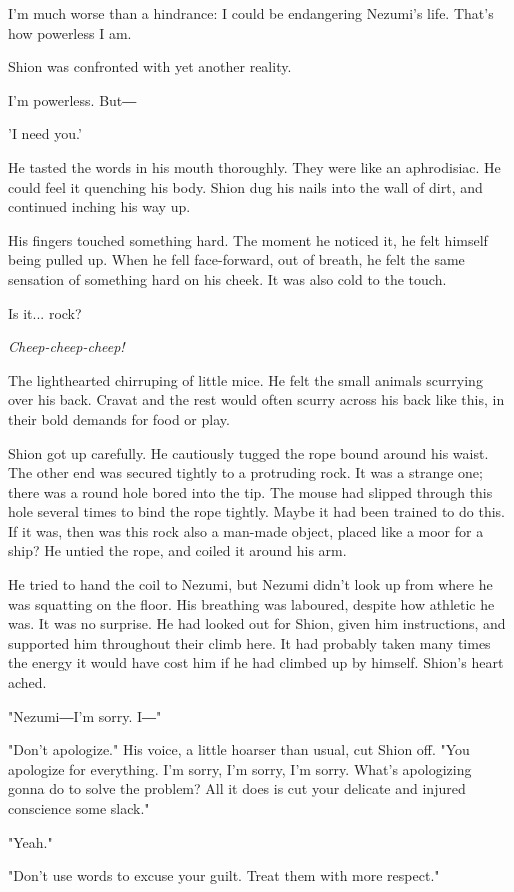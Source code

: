 I'm much worse than a hindrance: I could be endangering Nezumi's life.
That's how powerless I am.

Shion was confronted with yet another reality.

I'm powerless. But―

'I need you.'

He tasted the words in his mouth thoroughly. They were like an
aphrodisiac. He could feel it quenching his body. Shion dug his nails
into the wall of dirt, and continued inching his way up.

His fingers touched something hard. The moment he noticed it, he felt
himself being pulled up. When he fell face-forward, out of breath, he
felt the same sensation of something hard on his cheek. It was also cold
to the touch.

Is it... rock?

\emph{Cheep-cheep-cheep!}

The lighthearted chirruping of little mice. He felt the small animals
scurrying over his back. Cravat and the rest would often scurry across
his back like this, in their bold demands for food or play.

Shion got up carefully. He cautiously tugged the rope bound around his
waist. The other end was secured tightly to a protruding rock. It was a
strange one; there was a round hole bored into the tip. The mouse had
slipped through this hole several times to bind the rope tightly. Maybe
it had been trained to do this. If it was, then was this rock also a
man-made object, placed like a moor for a ship? He untied the rope, and
coiled it around his arm.

He tried to hand the coil to Nezumi, but Nezumi didn't look up from
where he was squatting on the floor. His breathing was laboured, despite
how athletic he was. It was no surprise. He had looked out for Shion,
given him instructions, and supported him throughout their climb here.
It had probably taken many times the energy it would have cost him if he
had climbed up by himself. Shion's heart ached.

"Nezumi―I'm sorry. I―"

"Don't apologize." His voice, a little hoarser than usual, cut Shion
off. "You apologize for everything. I'm sorry, I'm sorry, I'm sorry.
What's apologizing gonna do to solve the problem? All it does is cut
your delicate and injured conscience some slack."

"Yeah."

"Don't use words to excuse your guilt. Treat them with more respect."

